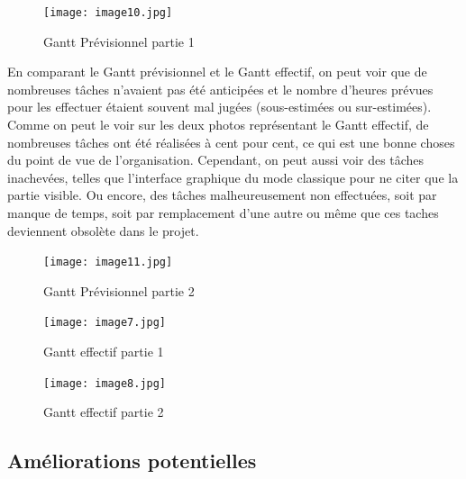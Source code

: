 \documentclass[a4paper,11pt]{article}
\begin{document}
\begin{figure}[ht!]
\centering
\texttt{[image: image10.jpg]} 
\caption {\label{image10} Gantt Prévisionnel partie 1}
\end{figure}
 \smallbreak

En comparant le Gantt prévisionnel et le Gantt effectif, on peut voir que de nombreuses tâches n'avaient pas été anticipées et le nombre d'heures prévues pour les effectuer étaient souvent mal jugées (sous-estimées ou sur-estimées). Comme on peut le voir sur les deux photos  représentant le Gantt effectif, de nombreuses tâches ont été réalisées à cent pour cent, ce qui est une bonne choses du point de vue de l'organisation. Cependant, on peut aussi voir des tâches inachevées, telles que l'interface graphique du mode classique pour ne citer que la partie visible. Ou encore, des tâches malheureusement non effectuées, soit par manque de temps, soit par remplacement d'une autre ou même que ces taches deviennent obsolète dans le projet.

\begin{figure}[ht!]
\centering
\texttt{[image: image11.jpg]} 
\caption {\label{image11} Gantt Prévisionnel partie 2}
\end{figure}
 \smallbreak
\begin{figure}[ht!]
\centering
\texttt{[image: image7.jpg]} 
\caption {\label{image12} Gantt effectif partie 1}
\end{figure}
 \smallbreak
\begin{figure}[ht!]
\centering
\texttt{[image: image8.jpg]} 
\caption {\label{image13} Gantt effectif partie 2}
\end{figure}
 \smallbreak



\subsection{Améliorations potentielles}
\end{document}
